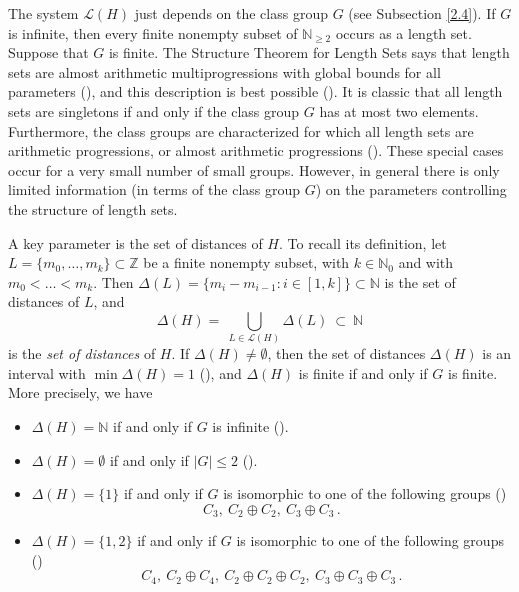 \documentclass[a4paper, 10pt]{amsart}
\theoremstyle{plain}
\theoremstyle{definition}
\theoremstyle{definition}
\newcommand{\N}{\mathbb N}
\newcommand{\Z}{\mathbb Z}
\numberwithin{equation}{section}
\begin{document}
The system $\mathcal L (H)$ just depends on the class group $G$ (see Subsection \ref{2.4}). If $G$ is infinite, then every finite nonempty subset of $\N_{\ge 2}$ occurs as a length set. Suppose that $G$ is finite. 
The Structure Theorem for Length Sets says that  length sets  are almost arithmetic multiprogressions with global bounds for all parameters (\cite[Section 7.3]{Ge-Gr-Zh26a}), and this description is best possible (\cite{Sc09a}). 
It is classic that all length sets are singletons if and only if the class group $G$ has at most two elements. Furthermore, the class groups are characterized for which all length sets are arithmetic progressions, or almost arithmetic progressions (\cite[Corollaries 8.2.21 and 9.2.7]{Ge-Gr-Zh26a}). These special cases occur for a very small number of small groups. 
However, in general there is   only limited information (in terms of the class group $G$) on the parameters controlling the structure of length sets. 

A key parameter is the set of distances of $H$. To recall its definition, let
$L = \{m_0, \ldots, m_k\} \subset \Z$ be a finite nonempty subset,  with $k \in \N_0$ and with $m_0 < \ldots < m_k$. Then  $\Delta (L) = \{m_i - m_{i-1} \colon i \in [1, k] \} \subset \N$ is the set of distances of $L$, and 
\[
\Delta (H) = \ \bigcup_{L \in \mathcal L (H)} \Delta (L) \ \subset \ \N
\]
is the {\it set of distances} of $H$.
If $\Delta (H) \ne \emptyset$, then the set of distances $\Delta (H)$ is an interval with $\min \Delta (H) = 1$ (\cite[Theorem 6.1.5]{Ge-Gr-Zh26a}), and $\Delta (H)$ is finite if and only if $G$ is finite. More precisely, we have
\begin{itemize}
\item[(a)] $\Delta (H) = \N$ if and only if $G$ is infinite (\cite[Theorem 6.4.2]{Ge-HK06a}).

\item[(b)] $\Delta (H) = \emptyset$ if and only if $|G| \le 2$ (\cite[Corollary 3.4.12]{Ge-HK06a}).

\item[(c)] $\Delta (H) = \{1\}$ if and only if $G$ is isomorphic to one of the following groups (\cite[Corollary 6.2.4]{Ge-Gr-Zh26a})
    \[
    C_3, \ C_2 \oplus C_2, \ C_3 \oplus C_3 \,.
    \]

\item[(d)] $\Delta (H) = \{1,2\}$ if and only if $G$ is isomorphic to one of the following groups (\cite[Corollary 6.2.14]{Ge-Gr-Zh26a})
    \[
    C_4, \ C_2 \oplus C_4, \ C_2 \oplus C_2 \oplus C_2, \ C_3 \oplus C_3 \oplus C_3 \,.
    \]
\end{itemize}
\end{document}
